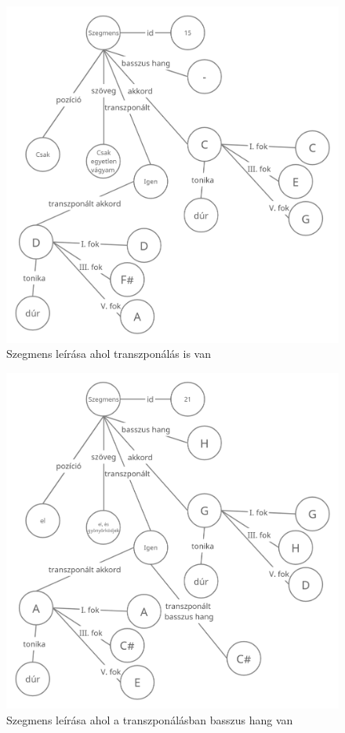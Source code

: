 \begin{figure}[h]
	\includegraphics[scale=0.3]{images/rdf_graph_5.png}
	\caption{Szegmens leírása ahol transzponálás is van}
	\label{fig:graph5}
\end{figure}
\newpage
\begin{figure}[h]
	\includegraphics[scale=0.3]{images/rdf_graph_6.png}
	\caption{Szegmens leírása ahol a transzponálásban basszus hang van}
	\label{fig:graph6}
\end{figure}



